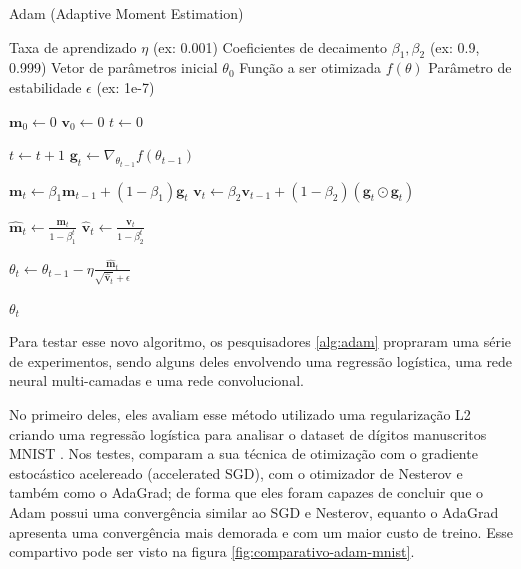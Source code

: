 \begin{algorithm}[H]
    \caption{Adam (Adaptive Moment Estimation)}
    \label{alg:adam-corrigido}
    \begin{algorithmic}[1]

    \Require Taxa de aprendizado $\eta$ (ex: 0.001)
    \Require Coeficientes de decaimento $\beta_1, \beta_2$ (ex: 0.9, 0.999)
    \Require Vetor de parâmetros inicial $\theta_0$
    \Require Função a ser otimizada $f(\theta)$
    \Require Parâmetro de estabilidade $\epsilon$ (ex: 1e-7)

    \State $\mathbf{m}_0 \leftarrow 0$ 
    \State $\mathbf{v}_0 \leftarrow 0$ 
    \State $t \leftarrow 0$ 

        \State $t \leftarrow t + 1$
        \State $\mathbf{g}_t \leftarrow \nabla_{\theta_{t-1}} f(\theta_{t-1})$
        
        \State $\mathbf{m}_t \leftarrow \beta_1 \mathbf{m}_{t-1} + (1 - \beta_1) \mathbf{g}_t$
        \State $\mathbf{v}_t \leftarrow \beta_2 \mathbf{v}_{t-1} + (1 - \beta_2) (\mathbf{g}_t \odot \mathbf{g}_t)$
        
        \State $\mathbf{\hat{m}}_t \leftarrow \frac{\mathbf{m}_t}{1 - \beta_1^t}$
        \State $\mathbf{\hat{v}}_t \leftarrow \frac{\mathbf{v}_t}{1 - \beta_2^t}$
        
        \State $\theta_t \leftarrow \theta_{t-1} - \eta  \frac{\mathbf{\hat{m}}_t}{\sqrt{\mathbf{\hat{v}}_t} + \epsilon}$
    \EndWhile

    \State \Return $\theta_t$ 
    \end{algorithmic}
\end{algorithm}

Para testar esse novo algoritmo, os pesquisadores \ref{alg:adam} propraram uma série de experimentos, sendo alguns deles envolvendo uma regressão logística, uma rede neural multi-camadas e uma rede convolucional.

No primeiro deles, eles avaliam esse método utilizado uma regularização L2 criando uma regressão logística para analisar o dataset de dígitos manuscritos MNIST \parencite{AdamMethod}. Nos testes, \textcite{AdamMethod} comparam a sua técnica de otimização com o gradiente estocástico acelereado (accelerated SGD), com o otimizador de Nesterov e também como o AdaGrad; de forma que eles foram capazes de concluir que o Adam possui uma convergência similar ao SGD e Nesterov, equanto o AdaGrad apresenta uma convergência mais demorada e com um maior custo de treino. Esse compartivo pode ser visto na figura \ref{fig:comparativo-adam-mnist}.

